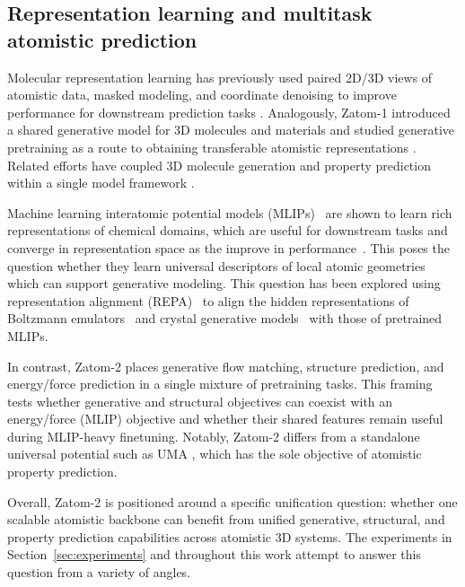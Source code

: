 \documentclass{article} %
\begin{document}
\subsection{Representation learning and multitask atomistic prediction}

Molecular representation learning has previously used paired 2D/3D views of atomistic data, masked modeling, and coordinate denoising to improve performance for downstream prediction tasks \citep{liu2022graphmvp,zhou2023unimol,zaidi2023pretraining}. Analogously, Zatom-1 introduced a shared generative model for 3D molecules and materials and studied generative pretraining as a route to obtaining transferable atomistic representations \citep{morehead2026zatom1}. Related efforts have coupled 3D molecule generation and property prediction within a single model framework \citep{feng2025unigem}.

Machine learning interatomic potential models (MLIPs)~\citep{Batatia2022mace,neumann2024orb,wood2025uma} are shown to learn rich representations of chemical domains, which are useful for downstream tasks \citep{wedig2025remdi} and converge in representation space as the improve in performance~\citep{edamadaka2025universallyconvergingrepresentationsmatter,li2026platonic}. This poses the question whether they learn universal descriptors of local atomic geometries which can support generative modeling. This question has been explored using representation alignment (REPA)~\citep{yu2025representation} to align the hidden representations of Boltzmann emulators~\citep{pinede2025unifying} and crystal generative models~\citep{zhang2026crystalrepatransferringphysicalpriors} with those of pretrained MLIPs.

In contrast, Zatom-2 places generative flow matching, structure prediction, and energy/force prediction in a single mixture of pretraining tasks. This framing tests whether generative and structural objectives can coexist with an energy/force (MLIP) objective and whether their shared features remain useful during MLIP-heavy finetuning. Notably, Zatom-2 differs from a standalone universal potential such as UMA \citep{wood2025uma}, which has the sole objective of atomistic property prediction.

Overall, Zatom-2 is positioned around a specific unification question: whether one scalable atomistic backbone can benefit from unified generative, structural, and property prediction capabilities across atomistic 3D systems. The experiments in Section~\ref{sec:experiments} and throughout this work attempt to answer this question from a variety of angles.
\end{document}
